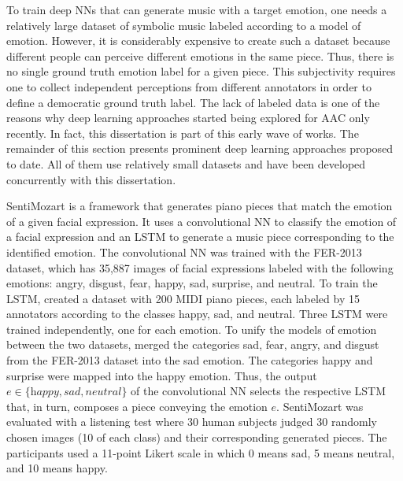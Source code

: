 To train deep NNs that can generate music with a target emotion, one needs a relatively large dataset of symbolic music labeled according to a model of emotion. However, it is considerably expensive to create such a dataset because different people can perceive different emotions in the same piece. Thus, there is no single ground truth emotion label for a given piece. This subjectivity requires one to collect independent perceptions from different annotators in order to define a democratic ground truth label. The lack of labeled data is one of the reasons why deep learning approaches started being explored for AAC only recently. In fact, this dissertation is part of this early wave of works. The remainder of this section presents prominent deep learning approaches proposed to date. All of them use relatively small datasets and have been developed concurrently with this dissertation.

SentiMozart \cite{madhok2018sentimozart} is a framework that generates piano pieces that match the emotion of a given facial expression. It uses a convolutional NN to classify the emotion of a facial expression and an LSTM to generate a music piece corresponding to the identified emotion. The convolutional NN was trained with the FER-2013 \cite{goodfellow2013challenges} dataset, which has 35,887 images of facial expressions labeled with the following emotions: angry, disgust, fear, happy, sad, surprise, and neutral. To train the LSTM, \citet{madhok2018sentimozart} created a dataset with 200 MIDI piano pieces, each labeled by 15 annotators according to the classes happy, sad, and neutral. Three LSTM were trained independently, one for each emotion. To unify the models of emotion between the two datasets, \citet{madhok2018sentimozart} merged the categories sad, fear, angry, and disgust from the FER-2013 dataset into the sad emotion. The categories happy and surprise were mapped into the happy emotion. Thus, the output $e \in \{\textit{happy}, \textit{sad}, \textit{neutral}\}$ of the convolutional NN selects the respective LSTM that, in turn, composes a piece conveying the emotion $e$. SentiMozart was evaluated with a listening test where 30 human subjects judged 30 randomly chosen images (10 of each class) and their corresponding generated pieces. The participants used a 11-point Likert scale in which 0 means sad, 5 means neutral, and 10 means happy.

